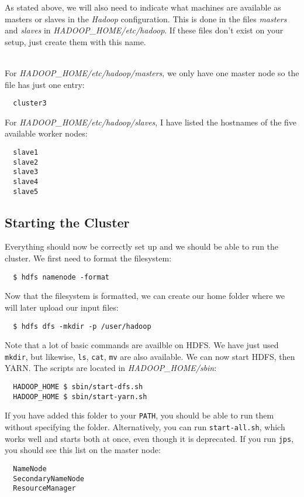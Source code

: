 \documentclass[a4paper, 12pt]{article}
\begin{document}
As stated above, we will also need to indicate what machines are available as masters or slaves in the \textit{Hadoop} configuration. This is done in the files \textit{masters} and \textit{slaves} in \textit{HADOOP\_HOME/etc/hadoop}. If these files don't exist on your setup, just create them with this name.

~\\
For \textit{HADOOP\_HOME/etc/hadoop/masters}, we only have one master node so the file has just one entry:

\begin{verbatim}
  cluster3
\end{verbatim}

For \textit{HADOOP\_HOME/etc/hadoop/slaves}, I have listed the hostnames of the five available worker nodes:

\begin{verbatim}
  slave1
  slave2
  slave3
  slave4
  slave5
\end{verbatim}

  \subsection{Starting the Cluster}
  
Everything should now be correctly set up and we should be able to run the cluster. We first need to format the filesystem:

\begin{verbatim}
  $ hdfs namenode -format
\end{verbatim}

Now that the filesystem is formatted, we can create our home folder where we will later upload our input files:

\begin{verbatim}
  $ hdfs dfs -mkdir -p /user/hadoop
\end{verbatim}

Note that a lot of basic commands are availble on HDFS. We have just used \texttt{mkdir}, but likewise, \texttt{ls}, \texttt{cat}, \texttt{mv} are also available. We can now start HDFS, then YARN. The scripts are located in \textit{HADOOP\_HOME/sbin}:

\begin{verbatim}
  HADOOP_HOME $ sbin/start-dfs.sh
  HADOOP_HOME $ sbin/start-yarn.sh
\end{verbatim}

If you have added this folder to your \texttt{PATH}, you should be able to run them without specifying the folder. Alternatively, you can run \texttt{start-all.sh}, which works well and starts both at once, even though it is deprecated. If you run \texttt{jps}, you should see this list on the master node:
\begin{verbatim}
  NameNode
  SecondaryNameNode
  ResourceManager
\end{verbatim}
\end{document}
